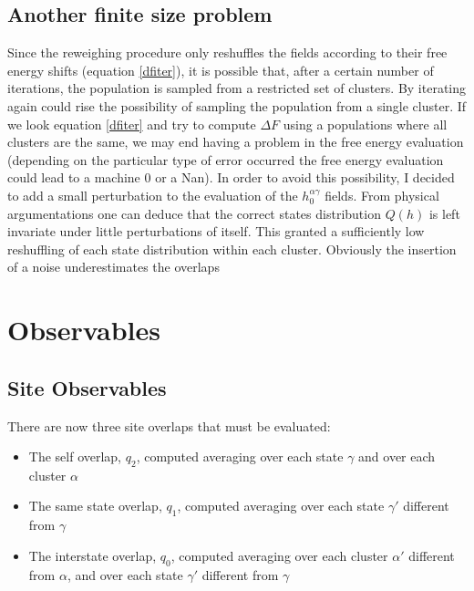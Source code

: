 



\subsection{Another finite size problem}

Since the reweighing procedure only reshuffles the fields according to their free energy shifts (equation \ref{dfiter}), it is possible that, after a certain number of iterations, the population is sampled from a restricted set of clusters. By iterating again could rise the possibility of sampling the population from a single cluster. If we look equation \ref{dfiter} and try to compute $\Delta F$ using a populations where all clusters are the same, we may end having a problem in the free energy evaluation (depending on the particular type of error occurred the free energy evaluation could lead to a machine $0$ or a Nan). In order to avoid this possibility, I decided to add a
small perturbation to the evaluation of the $h_0 ^ {\alpha\gamma}$ fields. From physical argumentations \cite{vulpiani} one can deduce that the correct states distribution $Q(h)$ is left invariate under little perturbations of itself. This granted a sufficiently low reshuffling of each state distribution within each cluster. Obviously the insertion of a noise underestimates the overlaps



\section{Observables}

\subsection{Site Observables}

There are now three site overlaps that must be evaluated:
\begin{itemize}

\item{The self overlap, $q_2$, computed averaging over each state $\gamma$ and over each cluster $\alpha$}
\item{The same state overlap, $q_1$, computed averaging over each state $\gamma'$ different from $\gamma$}
\item{The interstate overlap, $q_0$, computed averaging over each cluster $\alpha'$ different from $\alpha$, and over each state $\gamma'$ different from $\gamma$}

\end{itemize}


